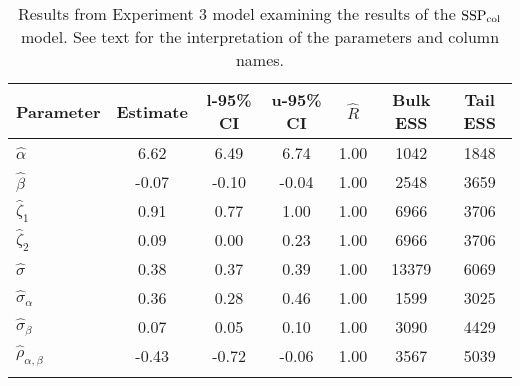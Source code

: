 \begin{table}

\caption{Results from Experiment 3 model examining the results of the $\operatorname{SSP}_{\text{col}}$ model. \label{tab:Experiment 3-SSPobs}See text for the interpretation of the parameters and column names.}

\begin{tabular}{l *3{S[table-format=-1.2]} S[table-format=1.2] *2{S[table-format=5.0]}}
\lsptoprule
Parameter & {Estimate} & {l-95\% CI} & {u-95\% CI} & {$\hat{R}$} & {Bulk ESS} & {Tail ESS}\\
\midrule
$\hat\alpha$ & 6.62 & 6.49 & 6.74 & 1.00 & 1042 & 1848\\
$\hat\beta$ & -0.07 & -0.10 & -0.04 & 1.00 & 2548 & 3659\\
$\hat\zeta_{1}$ & 0.91 & 0.77 & 1.00 & 1.00 & 6966 & 3706\\
$\hat\zeta_{2}$ & 0.09 & 0.00 & 0.23 & 1.00 & 6966 & 3706\\
$\hat\sigma$ & 0.38 & 0.37 & 0.39 & 1.00 & 13379 & 6069\\
$\hat\sigma_{\alpha}$ & 0.36 & 0.28 & 0.46 & 1.00 & 1599 & 3025\\
$\hat\sigma_{\beta}$ & 0.07 & 0.05 & 0.10 & 1.00 & 3090 & 4429\\
$\hat\rho_{\alpha,\beta}$ & -0.43 & -0.72 & -0.06 & 1.00 & 3567 & 5039\\
\lspbottomrule
\end{tabular}

\end{table}






